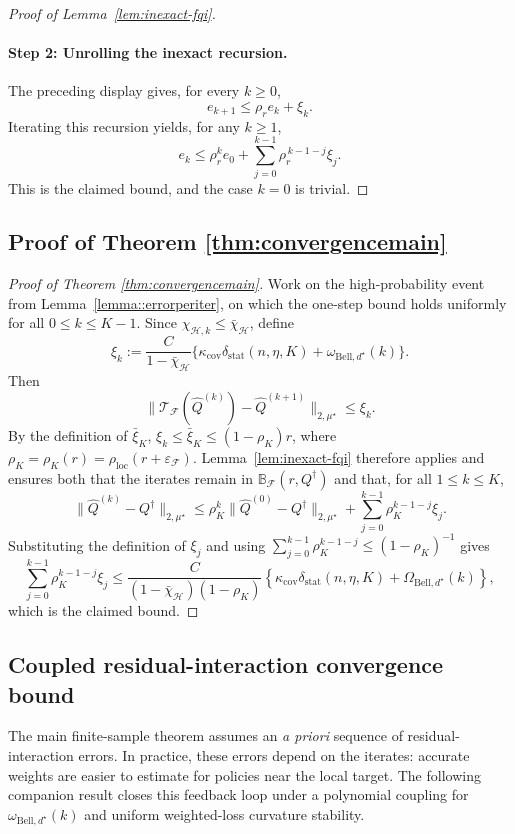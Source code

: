 \documentclass{article}
\theoremstyle{plain}
\theoremstyle{definition}
\theoremstyle{remark}
\begin{document}
\begin{proof}[Proof of Lemma~\ref{lem:inexact-fqi}]
\paragraph{Step 2: Unrolling the inexact recursion.}
The preceding display gives, for every \(k \ge 0\),
\[
e_{k+1}
\le
\rho_r e_k + \xi_k.
\]
Iterating this recursion yields, for any \(k \ge 1\),
\[
e_k
\le
\rho_r^k e_0
+
\sum_{j=0}^{k-1} \rho_r^{\,k-1-j}\xi_j.
\]
This is the claimed bound, and the case \(k = 0\) is trivial.
\end{proof}

\subsection{Proof of Theorem \ref{thm:convergencemain}}

\begin{proof}[Proof of Theorem \ref{thm:convergencemain}]
Work on the high-probability event from Lemma~\ref{lemma::errorperiter}, on
which the one-step bound holds uniformly for all \(0\le k\le K-1\). Since
\(\chi_{\mathcal H,k}\le\bar\chi_{\mathcal H}\), define
\[
\xi_k
:=
\frac{C}{1-\bar\chi_{\mathcal H}}
\{\kappa_{\mathrm{cov}}\delta_{\mathrm{stat}}(n,\eta,K)
+\omega_{\mathrm{Bell},d^\star}(k)\}.
\]
Then
\[
\|\mathcal T_{\mathcal F}(\widehat Q^{(k)})-
\widehat Q^{(k+1)}\|_{2,\mu^\star}
\le \xi_k .
\]
By the definition of \(\bar\xi_K\), \(\xi_k\le\bar\xi_K\le
(1-\rho_K)r\), where \(\rho_K=\rho_K(r)=\rho_{\mathrm{loc}}(r+
\varepsilon_{\mathcal F})\). Lemma~\ref{lem:inexact-fqi} therefore applies and
ensures both that the iterates remain in
\(\mathbb B_{\mathcal F}(r,Q^\dagger)\) and that, for all \(1\le k\le K\),
\[
\|\widehat Q^{(k)}-Q^\dagger\|_{2,\mu^\star}
\le
\rho_K^k\|\widehat Q^{(0)}-Q^\dagger\|_{2,\mu^\star}
+
\sum_{j=0}^{k-1}\rho_K^{k-1-j}\xi_j .
\]
Substituting the definition of \(\xi_j\) and using
\(\sum_{j=0}^{k-1}\rho_K^{k-1-j}\le(1-\rho_K)^{-1}\) gives
\[
\sum_{j=0}^{k-1}\rho_K^{k-1-j}\xi_j
\le
\frac{C}{(1-\bar\chi_{\mathcal H})(1-\rho_K)}
\left\{
\kappa_{\mathrm{cov}}\delta_{\mathrm{stat}}(n,\eta,K)
+
\Omega_{\mathrm{Bell},d^\star}(k)
\right\},
\]
which is the claimed bound.
\end{proof}


\subsection{Coupled residual-interaction convergence bound}
\label{app:coupled-weight-error}

The main finite-sample theorem assumes an \emph{a priori} sequence of
residual-interaction errors. In practice, these errors depend on the iterates:
accurate weights are easier to estimate for policies near the local target. The
following companion result closes this feedback loop under a polynomial coupling
for \(\omega_{\mathrm{Bell},d^\star}(k)\) and uniform weighted-loss curvature stability.
\end{document}
